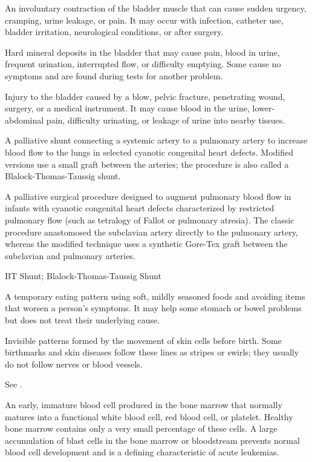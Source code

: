  An involuntary contraction of the bladder muscle that
can cause sudden urgency, cramping, urine leakage, or pain. It may occur with
infection, catheter use, bladder irritation, neurological conditions, or after
surgery.

 Hard mineral deposits in the bladder that may cause pain, blood in urine, frequent urination, interrupted flow, or difficulty emptying. Some cause no symptoms and are found during tests for another problem.

 Injury to the bladder caused by a blow, pelvic fracture, penetrating wound, surgery, or a medical instrument. It may cause blood in the urine, lower-abdominal pain, difficulty urinating, or leakage of urine into nearby tissues.

 A palliative shunt connecting a systemic artery to a pulmonary artery to increase blood flow to the lungs in selected cyanotic congenital heart defects. Modified versions use a small graft between the arteries; the procedure is also called a Blalock-Thomas-Taussig shunt.

 A palliative surgical procedure designed to augment pulmonary blood flow in infants with cyanotic congenital heart defects characterized by restricted pulmonary flow (such as tetralogy of Fallot or pulmonary atresia). The classic procedure anastomosed the subclavian artery directly to the pulmonary artery, whereas the modified technique uses a synthetic Gore-Tex graft between the subclavian and pulmonary arteries.

\synonyms
BT Shunt; Blalock-Thomas-Taussig Shunt

 A temporary eating pattern using soft, mildly seasoned foods and avoiding items that worsen a person's symptoms. It may help some stomach or bowel problems but does not treat their underlying cause.

 Invisible patterns formed by the movement of skin cells before birth. Some birthmarks and skin diseases follow these lines as stripes or swirls; they usually do not follow nerves or blood vessels.

 See .

 An early, immature blood cell produced in the bone marrow that normally matures into a functional white blood cell, red blood cell, or platelet. Healthy bone marrow contains only a very small percentage of these cells. A large accumulation of blast cells in the bone marrow or bloodstream prevents normal blood cell development and is a defining characteristic of acute leukemias.


